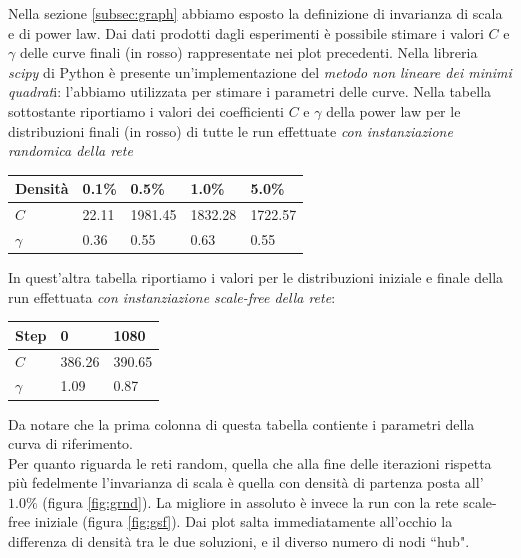 \documentclass[a4paper,12pt]{article}
\begin{document}
Nella sezione \ref{subsec:graph} abbiamo esposto la definizione di invarianza di scala e di power law. Dai dati prodotti dagli esperimenti è possibile stimare i valori $C$ e $\gamma$ delle curve finali (in rosso) rappresentate nei plot precedenti. Nella libreria \textit{scipy} di Python è presente un'implementazione del \textit{metodo non lineare dei minimi quadrat}i: l'abbiamo utilizzata per stimare i parametri delle curve.
Nella tabella sottostante riportiamo i valori dei coefficienti $C$ e $\gamma$ della power law per le distribuzioni finali (in rosso) di tutte le run effettuate \textit{con instanziazione randomica della rete} 
\begin{center}
    \begin{tabular}{| l | l | l | l | l |}
    \hline
    Densità & 0.1\% & 0.5\% & 1.0\% & 5.0\% \\ \hline \hline
	$C$ & 22.11 & 1981.45 & 1832.28 & 1722.57 \\ \hline
	$\gamma$ & 0.36 & 0.55 & 0.63 & 0.55 \\ \hline
    \end{tabular}
\end{center}
In quest'altra tabella riportiamo i valori per le distribuzioni iniziale e finale della run effettuata \textit{con instanziazione scale-free della rete}:
\begin{center}
    \begin{tabular}{| l | l | l |}
    \hline
    Step & 0 & 1080 \\ \hline \hline
	$C$ & 386.26 & 390.65 \\ \hline
	$\gamma$ & 1.09 & 0.87 \\ \hline
    \end{tabular}
\end{center}
Da notare che la prima colonna di questa tabella contiente i parametri della curva di riferimento. \\
Per quanto riguarda le reti random, quella che alla fine delle iterazioni rispetta più fedelmente l'invarianza di scala è quella con densità di partenza posta all'$1.0\%$ (figura \ref{fig:grnd}). La migliore in assoluto è invece la run con la rete scale-free iniziale (figura \ref{fig:gsf}). Dai plot salta immediatamente all'occhio la differenza di densità tra le due soluzioni, e il diverso numero di nodi ``hub".
\end{document}
